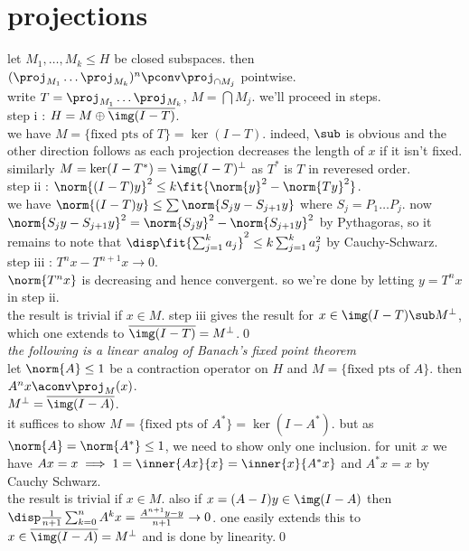 \section*{projections}
 let $M_1,\dots,M_k\le H$ be closed subspaces. then $(\proj_{M_1}\dots\proj_{M_k})^n\pconv\proj_{\cap M_j}$ pointwise.\\
 write $T=\proj_{M_1}\dots\proj_{M_k}$, $M=\bigcap M_j$. we'll proceed in steps.\\
step i : $H=M\oplus\overline{\img (I-T)}$.\\
 we have $M=\{\text{fixed pts of }T\}=\ker(I-T)$. indeed, $\sub$ is obvious and the other direction follows as each projection decreases 
the length of $x$ if it isn't fixed. similarly $M=\ker (I-T^*)=\img(I-T)^\perp$ as $T^*$ is $T$ in reveresed order.\halfqed\\
step ii : $\norm{(I-T)y}^2\le k\fit{\norm{y}^2-\norm{Ty}^2}$.\\
 we have $\norm{(I-T)y}\le\sum\norm{S_jy-S_{j+1}y}$ where $S_j=P_1\dots P_j$. now $\norm{S_jy-S_{j+1}y}^2=\norm{S_jy}^2-\norm{S_{j+1}y}^2$ by Pythagoras, 
so it remains to note that $\disp\fit{\sum_{j=1}^k a_j}^2\le k\sum_{j=1}^k a_j^2$ by Cauchy-Schwarz.\halfqed\\
step iii : $T^nx-T^{n+1}x\to 0$.\\
 $\norm{T^nx}$ is decreasing and hence convergent. so we're done by letting $y=T^nx$ in step ii.\halfqed\\
the result is trivial if $x\in M$. step iii gives the result for $x\in \img(I-T)\sub M^\perp$, which one extends to $\overline{\img(I-T)}=M^\perp$.\qed\\
\textit{the following is a linear analog of Banach's fixed point theorem}\\
 let $\norm{A}\le1$ be a contraction operator on $H$ and $M=\{\text{fixed pts of }A\}$.  then $A^nx\aconv \proj_{M}(x)$.\\
 $M^\perp=\overline{\img(I-A)}$.\\
 it suffices to show $M=\{\text{fixed pts of }A^*\}=\ker(I-A^*)$. but as $\norm{A}=\norm{A^*}\le 1$, we need to show only one inclusion. 
for unit $x$ we have $Ax=x\implies 1=\inner{Ax}{x}=\inner{x}{A^*x}$ and $A^*x=x$ by Cauchy Schwarz.\halfqed\\
 the result is trivial if $x\in M$. also if $x=(A-I)y\in\img(I-A)$ then $\disp\frac{1}{n+1}\sum_{k=0}^n A^kx=\frac{A^{n+1}y-y}{n+1}\to0$. 
one easily extends this to $x\in\overline{\img(I-A)}=M^\perp$ and is done by linearity.\qed\\
